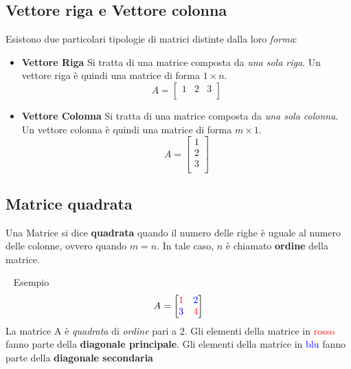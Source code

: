 \documentclass[12pt,oneside]{book}
\begin{document}
\subsection{Vettore riga e Vettore colonna}
Esistono due particolari tipologie di matrici distinte dalla loro \emph{forma}:
\begin{itemize}
    \item \textbf{Vettore Riga} \newline
          Si tratta di una matrice composta da \emph{una sola riga}. Un vettore riga è quindi una matrice
          di forma $1 \times n$.
          \begin{equation*}
              A =
              \begin{bmatrix}
                  1 & 2 & 3 \\
              \end{bmatrix}
          \end{equation*}
    \item \textbf{Vettore Colonna} \newline
          Si tratta di una matrice composta da \emph{una sola colonna}. Un vettore colonna è quindi una matrice
          di forma $m \times 1$.
          \begin{equation*}
              A =
              \begin{bmatrix}
                  1 \\ 2 \\ 3 \\
              \end{bmatrix}
          \end{equation*}
\end{itemize}

\newpage
\subsection{Matrice quadrata}
Una Matrice si dice \textbf{quadrata} quando il numero delle righe è uguale al numero delle colonne, ovvero quando
$m = n$. In tale caso, $n$ è chiamato \textbf{ordine} della matrice.

~\newline
Esempio
\begin{equation*}
    A =
    \begin{bmatrix}
        \color{red} 1  & \color{blue}2 \\
        \color{blue} 3 & \color{red} 4 \\
    \end{bmatrix}
\end{equation*}
La matrice A è \emph{quadrata} di \emph{ordine} pari a 2. Gli elementi della matrice in \textcolor{red}{rosso}
fanno parte della \textbf{diagonale principale}. Gli elementi della matrice in \textcolor{blue}{blu} fanno
parte della \textbf{diagonale secondaria}
\end{document}
